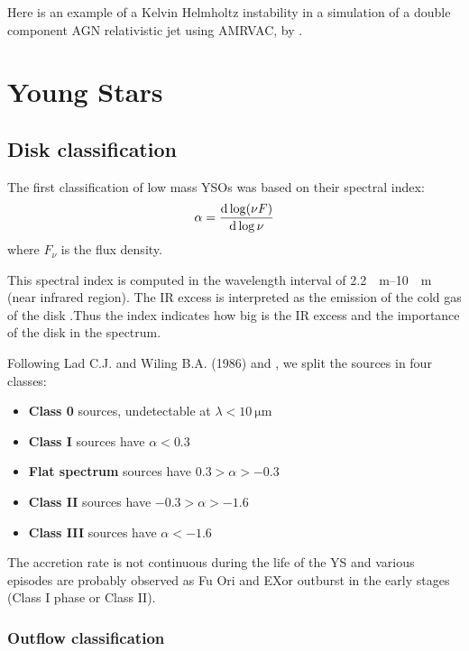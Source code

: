 \documentclass[10pt,a4paper,english]{article}
\begin{document}

Here is an example of a Kelvin Helmholtz instability in a simulation of a
double component AGN relativistic jet using AMRVAC, by
\cite{2009ApJ...705.1594M}.


\section{Young Stars}

\subsection{Disk classification}
The first classification of low mass YSOs was based on their spectral index:
\begin{equation}
    \alpha = \frac{\mathrm{d} \log (\nu F)}{\mathrm{d} \log \nu}
\end{equation}
where $F_\nu$ is the flux density.

This spectral index is computed in the wavelength interval of
\SIrange{2.2}{10}{\mu\m} (near infrared region). The IR excess is interpreted
as the emission of the cold gas of the disk .Thus the index indicates how big
is the IR excess and the importance of the disk in the spectrum.


Following Lad C.J. and Wiling B.A. (1986) and \cite{1993ApJ...406..122A}, we
split the sources in four classes:
\begin{itemize}
    \item \textbf{Class 0} sources, undetectable at $\lambda < \SI{10}{\micro\m}$
    \item \textbf{Class I} sources have $\alpha < 0.3$
    \item \textbf{Flat spectrum} sources have $0.3 > \alpha > -0.3$
    \item \textbf{Class II} sources have $-0.3 > \alpha > -1.6$
    \item \textbf{Class III} sources have $\alpha < -1.6$
\end{itemize}

The accretion rate is not continuous during the life of the YS and various
episodes are probably observed as Fu Ori and EXor outburst in the early stages
(Class I phase or Class II).


\subsubsection{Outflow classification}
\end{document}
